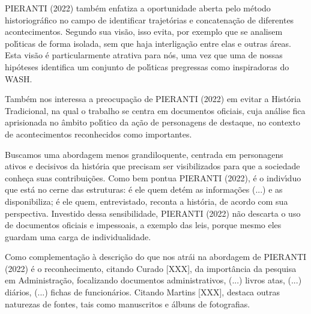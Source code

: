 \documentclass[
12pt,		%
openright,	%
twoside,  %
a4paper,			%
chapter=TITLE,		%
english,			%
french,				%
spanish,			%
brazil				%
]{USPSC-classe/USPSC}
\begin{document}
 PIERANTI (2022) tamb\'em enfatiza a oportunidade aberta pelo m\'etodo historiogr\'afico  no campo de identificar trajet\'orias e concatena\c{c}\~ao de diferentes acontecimentos. Segundo sua vis\~ao, \textquotedbl isso evita, por exemplo que se analisem pol\'{\i}ticas de forma isolada, sem que haja interliga\c{c}\~ao entre elas e outras \'areas\textquotedbl . Esta vis\~ao \'e particularmente atrativa para n\'os, uma vez que uma de nossas hip\'oteses identifica um conjunto de pol\'{\i}ticas pregressas como inspiradoras do WASH.










Tamb\'em nos interessa a preocupa\c{c}\~ao de  PIERANTI (2022) em evitar a Hist\'oria Tradicional, na qual o trabalho se centra em documentos oficiais, cuja an\'alise fica aprisionada no \^ambito pol\'{\i}tico da a\c{c}\~ao de \textquotedbl personagens de destaque\textquotedbl , no contexto de \textquotedbl acontecimentos reconhecidos como importantes\textquotedbl .










Buscamos uma abordagem menos grandiloquente, centrada em personagens ativos e decisivos da hist\'oria que precisam ser visibilizados para que a sociedade conhe\c{c}a suas contribui\c{c}\~oes. Como bem pontua  PIERANTI (2022), \textquotedbl \'e o indiv\'{\i}duo que est\'a no cerne das estruturas: \'e ele quem det\'em as informa\c{c}\~oes (...) e as disponibiliza; \'e ele quem, entrevistado, reconta a hist\'oria, de acordo com sua perspectiva\textquotedbl . Investido dessa sensibilidade,  PIERANTI (2022) n\~ao descarta o uso de documentos oficiais e impessoais, a exemplo das leis, porque mesmo eles \textquotedbl guardam uma carga de individualidade\textquotedbl .










Como complementa\c{c}\~ao \`a descri\c{c}\~ao do que nos atr\'ai na abordagem de  PIERANTI (2022) \'e o reconhecimento, citando Curado [XXX], da import\^ancia da pesquisa em Administra\c{c}\~ao, focalizando \textquotedbl documentos administrativos, (...) livros atas, (...) di\'arios, (...) fichas de funcion\'arios\textquotedbl . Citando Martins [XXX], destaca outras naturezas de fontes, tais como manuscritos e \'albuns de fotografias.
\end{document}

